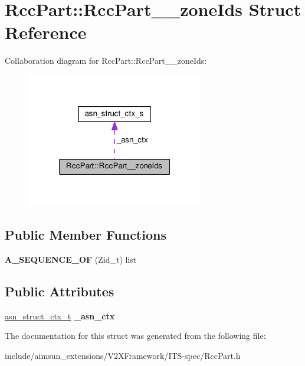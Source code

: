 \hypertarget{structRccPart_1_1RccPart____zoneIds}{}\section{Rcc\+Part\+:\+:Rcc\+Part\+\_\+\+\_\+zone\+Ids Struct Reference}
\label{structRccPart_1_1RccPart____zoneIds}


Collaboration diagram for Rcc\+Part\+:\+:Rcc\+Part\+\_\+\+\_\+zone\+Ids\+:\nopagebreak
\begin{figure}[H]
\begin{center}
\leavevmode
\includegraphics[width=220pt]{structRccPart_1_1RccPart____zoneIds__coll__graph}
\end{center}
\end{figure}
\subsection*{Public Member Functions}
\begin{DoxyCompactItemize}
\item 
{\bfseries A\+\_\+\+S\+E\+Q\+U\+E\+N\+C\+E\+\_\+\+OF} (Zid\+\_\+t) list\hypertarget{structRccPart_1_1RccPart____zoneIds_affc3356a7aacf14f704dbf6a05533f9a}{}\label{structRccPart_1_1RccPart____zoneIds_affc3356a7aacf14f704dbf6a05533f9a}

\end{DoxyCompactItemize}
\subsection*{Public Attributes}
\begin{DoxyCompactItemize}
\item 
\hyperlink{structasn__struct__ctx__s}{asn\+\_\+struct\+\_\+ctx\+\_\+t} {\bfseries \+\_\+asn\+\_\+ctx}\hypertarget{structRccPart_1_1RccPart____zoneIds_a3ca655e2844e218e9f6989e4a1ea633a}{}\label{structRccPart_1_1RccPart____zoneIds_a3ca655e2844e218e9f6989e4a1ea633a}

\end{DoxyCompactItemize}


The documentation for this struct was generated from the following file\+:\begin{DoxyCompactItemize}
\item 
include/aimsun\+\_\+extensions/\+V2\+X\+Framework/\+I\+T\+S-\/spec/Rcc\+Part.\+h\end{DoxyCompactItemize}
